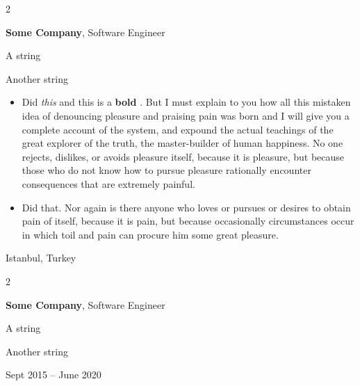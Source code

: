 \documentclass[10pt, letterpaper]{article}
\newenvironment{summary}{
    \begin{description}[
        topsep=0.10 cm,
        parsep=0.10 cm,
        partopsep=0pt,
        itemsep=0pt,
        leftmargin=0.4 cm + 10pt
    ]
}{
    \end{description}
} %
\newenvironment{highlights}{
    \begin{itemize}[
        topsep=0.10 cm,
        parsep=0.10 cm,
        partopsep=0pt,
        itemsep=0pt,
        leftmargin=0.4 cm + 10pt
    ]
}{
    \end{itemize}
} %
\newenvironment{twocolentry}[2][]{
    \onecolentry
    \def\secondColumn{#2}
    \setcolumnwidth{\fill, 4.5 cm}
    \begin{paracol}{2}
}{
    \switchcolumn \raggedleft \secondColumn
    \end{paracol}
    \endonecolentry
} %
\let\hrefWithoutArrow\href
\renewcommand{\href}[2]{\hrefWithoutArrow{#1}{\ifthenelse{\equal{#2}{}}{ }{#2 }\raisebox{.15ex}{\footnotesize \faExternalLink*}}}
\begin{document}
        \begin{twocolentry}{
            Istanbul, Turkey
        }
            \textbf{Some \textnormal{Company}}, Software Engineer
            \begin{summary}
                \item A string
                \item Another string
            \end{summary}
            \begin{highlights}
                \item Did \textit{this} and this is a \textbf{bold} \href{https://example.com}{link}. But I must explain to you how all this mistaken idea of denouncing pleasure and praising pain was born and I will give you a complete account of the system, and expound the actual teachings of the great explorer of the truth, the master-builder of human happiness. No one rejects, dislikes, or avoids pleasure itself, because it is pleasure, but because those who do not know how to pursue pleasure rationally encounter consequences that are extremely painful.
                \item Did that. Nor again is there anyone who loves or pursues or desires to obtain pain of itself, because it is pain, but because occasionally circumstances occur in which toil and pain can procure him some great pleasure.
            \end{highlights}
        \end{twocolentry}


        \vspace{0.2 cm}

        \begin{twocolentry}{
            Sept 2015 – June 2020
        }
            \textbf{Some \textnormal{Company}}, Software Engineer
            \begin{summary}
                \item A string
                \item Another string
            \end{summary}
        \end{twocolentry}


        \vspace{0.2 cm}
\end{document}
